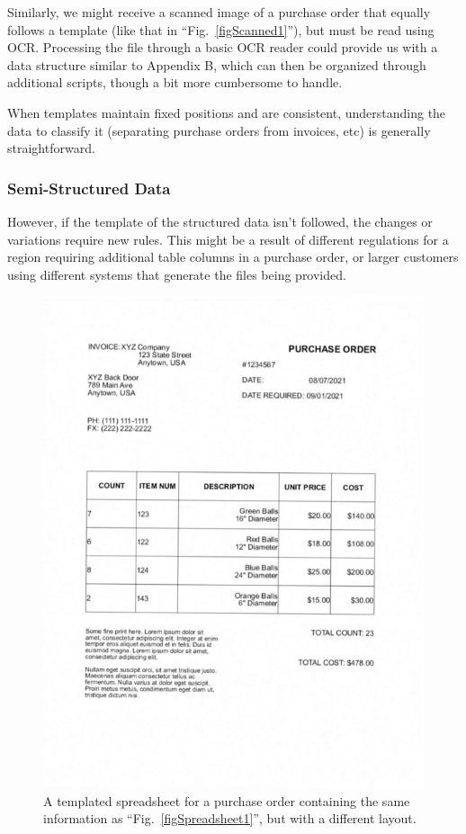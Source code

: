 \documentclass[conference]{IEEEtran}
\begin{document}
Similarly, we might receive a scanned image of a purchase order that equally follows a template (like that in ``Fig.~\ref{figScanned1}''), but must be read using OCR. Processing the file through a basic OCR reader could provide us with a data structure similar to Appendix B, which can then be organized through additional scripts, though a bit more cumbersome to handle.

When templates maintain fixed positions and are consistent, understanding the data to classify it (separating purchase orders from invoices, etc) is generally straightforward.

\subsubsection{Semi-Structured Data}
However, if the template of the structured data isn't followed, the changes or variations require new rules. This might be a result of different regulations for a region requiring additional table columns in a purchase order, or larger customers using different systems that generate the files being provided.

\begin{figure}[ht]
\centerline{\includegraphics[width=\columnwidth]{ORDER_2_scanned.png}}
\caption{A templated spreadsheet for a purchase order containing the same information as ``Fig.~\ref{figSpreadsheet1}'', but with a different layout.}
\label{figScanned2}
\end{figure}
\end{document}
